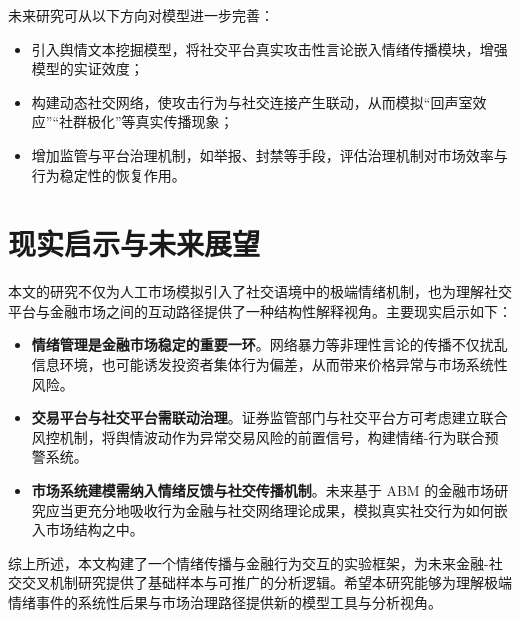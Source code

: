 未来研究可从以下方向对模型进一步完善：

\begin{itemize}
  \item 引入舆情文本挖掘模型，将社交平台真实攻击性言论嵌入情绪传播模块，增强模型的实证效度；
  \item 构建动态社交网络，使攻击行为与社交连接产生联动，从而模拟“回声室效应”“社群极化”等真实传播现象；
  \item 增加监管与平台治理机制，如举报、封禁等手段，评估治理机制对市场效率与行为稳定性的恢复作用。
\end{itemize}

\section{现实启示与未来展望}

本文的研究不仅为人工市场模拟引入了社交语境中的极端情绪机制，也为理解社交平台与金融市场之间的互动路径提供了一种结构性解释视角。主要现实启示如下：

\begin{itemize}
  \item \textbf{情绪管理是金融市场稳定的重要一环}。网络暴力等非理性言论的传播不仅扰乱信息环境，也可能诱发投资者集体行为偏差，从而带来价格异常与市场系统性风险。
  
  \item \textbf{交易平台与社交平台需联动治理}。证券监管部门与社交平台方可考虑建立联合风控机制，将舆情波动作为异常交易风险的前置信号，构建情绪-行为联合预警系统。
  
  \item \textbf{市场系统建模需纳入情绪反馈与社交传播机制}。未来基于 ABM 的金融市场研究应当更充分地吸收行为金融与社交网络理论成果，模拟真实社交行为如何嵌入市场结构之中。
\end{itemize}

综上所述，本文构建了一个情绪传播与金融行为交互的实验框架，为未来金融-社交交叉机制研究提供了基础样本与可推广的分析逻辑。希望本研究能够为理解极端情绪事件的系统性后果与市场治理路径提供新的模型工具与分析视角。

